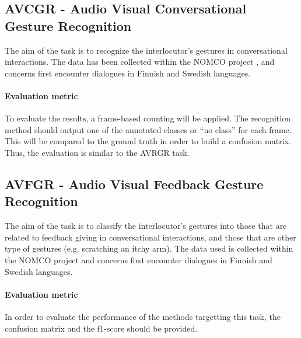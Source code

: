 \documentclass[a4paper]{article}
\begin{document}
\subsection*{AVCGR - Audio Visual Conversational Gesture Recognition}
The aim of the task is to recognize the interlocutor's gestures in  conversational interactions. The data has been
collected within the  NOMCO project \cite{Nomco}, and concerns first encounter dialogues in  Finnish and Swedish
languages.

\paragraph{Evaluation metric}
To evaluate the results, a frame-based counting will be applied. The recognition method should output one of the
annotated classes or ``no class'' for each frame. This will be compared to the ground truth in order to build a
confusion matrix. Thus, the evaluation is similar to the AVRGR task.

\subsection*{AVFGR - Audio Visual Feedback Gesture Recognition}
The aim of the task is to classify the interlocutor's gestures into those that are related to feedback giving in
conversational interactions, and those that are other type of gestures (e.g. scratching an itchy arm). The data used is
collected within the NOMCO project \cite{Nomco} and concerns first encounter dialogues in Finnish and Swedish languages.

\paragraph{Evaluation metric} In order to evaluate the performance of the methods targetting this task, the confusion
matrix and the f1-score should be provided.



\end{document}
